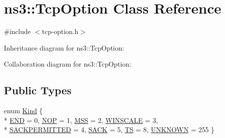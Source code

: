 \hypertarget{classns3_1_1TcpOption}{}\section{ns3\+:\+:Tcp\+Option Class Reference}
\label{classns3_1_1TcpOption}


{\ttfamily \#include $<$tcp-\/option.\+h$>$}



Inheritance diagram for ns3\+:\+:Tcp\+Option\+:


Collaboration diagram for ns3\+:\+:Tcp\+Option\+:
\subsection*{Public Types}
\begin{DoxyCompactItemize}
\item 
enum \hyperlink{classns3_1_1TcpOption_ab5fef728704d0ef8415899ca6af3efdd}{Kind} \{ \\*
\hyperlink{classns3_1_1TcpOption_ab5fef728704d0ef8415899ca6af3efdda905203642bcd2c4a51a9dc346cd295a9}{E\+ND} = 0, 
\hyperlink{classns3_1_1TcpOption_ab5fef728704d0ef8415899ca6af3efdda710bbdc827237e9fc5cbe0781852acb9}{N\+OP} = 1, 
\hyperlink{classns3_1_1TcpOption_ab5fef728704d0ef8415899ca6af3efddaa927b89500f86a569307a272077bb747}{M\+SS} = 2, 
\hyperlink{classns3_1_1TcpOption_ab5fef728704d0ef8415899ca6af3efddab982246aeba4e5c8a134da32317b44c0}{W\+I\+N\+S\+C\+A\+LE} = 3, 
\\*
\hyperlink{classns3_1_1TcpOption_ab5fef728704d0ef8415899ca6af3efddab7c52885f2df3f09365bbb3781261a06}{S\+A\+C\+K\+P\+E\+R\+M\+I\+T\+T\+ED} = 4, 
\hyperlink{classns3_1_1TcpOption_ab5fef728704d0ef8415899ca6af3efdda15a723b4b912895242cef1595f19b0a2}{S\+A\+CK} = 5, 
\hyperlink{classns3_1_1TcpOption_ab5fef728704d0ef8415899ca6af3efdda36327bb876e173f67d0881ecccc10bba}{TS} = 8, 
\hyperlink{classns3_1_1TcpOption_ab5fef728704d0ef8415899ca6af3efdda449e452dfb7a9644a2ea0981fee7064c}{U\+N\+K\+N\+O\+WN} = 255
 \}
\end{DoxyCompactItemize}
